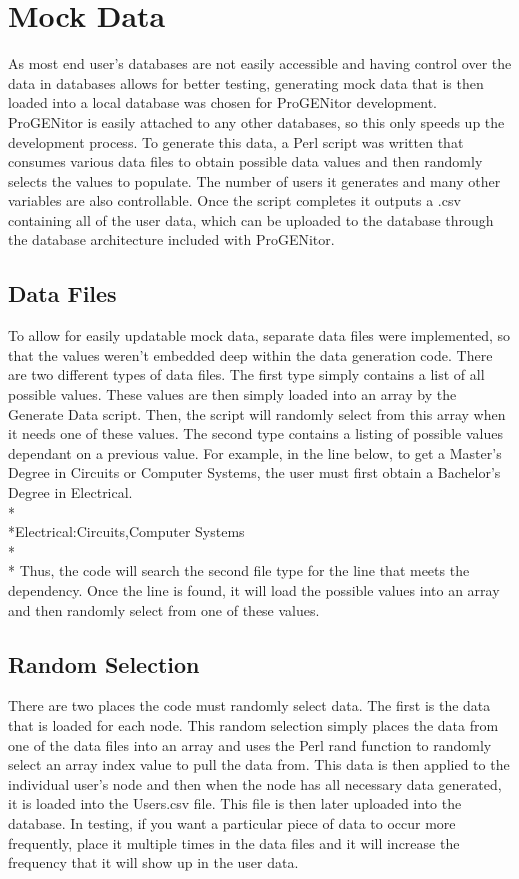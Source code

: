 \section{Mock Data}
\label{sect:mock-data}
As most end user's databases are not easily accessible and having control over
the data in databases allows for better testing, generating mock data that is
then loaded into a local database was chosen for ProGENitor development. 
ProGENitor is easily attached to any other databases, so this only speeds up the
development process.  To generate this data, a Perl script was written that
consumes various data files to obtain possible data values and then randomly
selects the values to populate.  The number of users it generates and many other
variables are also controllable.  Once the script completes it outputs a .csv
containing all of the user data, which can be uploaded to the database through
the database architecture included with ProGENitor.

\subsection{Data Files}
To allow for easily updatable mock data, separate data files were implemented,
so that the values weren't embedded deep within the data generation code.  There
are two different types of data files.  The first type simply contains a list
of all possible values.  These values are then simply loaded into an array by
the Generate Data script.  Then, the script will randomly select from this
array when it needs one of these values.  The second type contains a listing of
possible values dependant on a previous value.  For example, in the line below,
to get a Master's Degree in Circuits or Computer Systems, the user must first
obtain a Bachelor's Degree in Electrical.
\\*
\\*Electrical:Circuits,Computer Systems\\*
\\*
Thus, the code will search the second file type for the line that meets the
dependency.  Once the line is found, it will load the possible values into an
array and then randomly select from one of these values.

\subsection{Random Selection}
There are two places the code must randomly select data.  The first is the
data that is loaded for each node.  This random selection simply places the data
from one of the data files into an array and uses the Perl rand function to
randomly select an array index value to pull the data from.  This data is then
applied to the individual user's node and then when the node has all necessary
data generated, it is loaded into the Users.csv file.  This file is then later
uploaded into the database.  In testing, if you want a particular piece of data
to occur more frequently, place it multiple times in the data files and it
will increase the frequency that it will show up in the user data.

